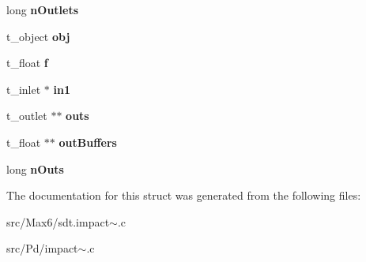 \begin{DoxyCompactItemize}
\item 
\hypertarget{struct__impact_a3c6a41532afbea887a569a52ea0c9788}{}long {\bfseries n\+Outlets}\label{struct__impact_a3c6a41532afbea887a569a52ea0c9788}

\item 
\hypertarget{struct__impact_a21775ab6bc98b0961a6e9fd9d832e65b}{}t\+\_\+object {\bfseries obj}\label{struct__impact_a21775ab6bc98b0961a6e9fd9d832e65b}

\item 
\hypertarget{struct__impact_a73198eb29c82f0df575e45396b68c18c}{}t\+\_\+float {\bfseries f}\label{struct__impact_a73198eb29c82f0df575e45396b68c18c}

\item 
\hypertarget{struct__impact_a10a16d82168f65ea70919072c6fbcaf4}{}t\+\_\+inlet $\ast$ {\bfseries in1}\label{struct__impact_a10a16d82168f65ea70919072c6fbcaf4}

\item 
\hypertarget{struct__impact_a9969dd4d92a26edc6ae93f173d0466a1}{}t\+\_\+outlet $\ast$$\ast$ {\bfseries outs}\label{struct__impact_a9969dd4d92a26edc6ae93f173d0466a1}

\item 
\hypertarget{struct__impact_ab6b69dd90f21fd17a86a406beabd9138}{}t\+\_\+float $\ast$$\ast$ {\bfseries out\+Buffers}\label{struct__impact_ab6b69dd90f21fd17a86a406beabd9138}

\item 
\hypertarget{struct__impact_a98798f8f2fab0ae96d3c2f8eae6ff490}{}long {\bfseries n\+Outs}\label{struct__impact_a98798f8f2fab0ae96d3c2f8eae6ff490}

\end{DoxyCompactItemize}


The documentation for this struct was generated from the following files\+:\begin{DoxyCompactItemize}
\item 
src/\+Max6/sdt.\+impact$\sim$.\+c\item 
src/\+Pd/impact$\sim$.\+c\end{DoxyCompactItemize}
